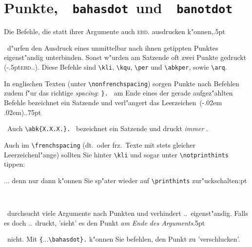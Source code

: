 \documentclass[12pt,a4paper]{article}
\newcommand{\pdfko}[1]{\kern #1pt
                          \strut\ignorespaces}%
\newcommand{\pbs}{\string\ \unskip}
\newcommand{\bs}{\protect\pbs}
\begin{document}

\newpage
\section{Punkte, \,\texttt{\bs bahasdot} \,und \,\texttt{\bs banotdot}}\label{Sect10}\label{Punkte}

Die \BibArts\hy Befehle, die statt ihrer Argumente auch \textsc{ebd.} 
ausdrucken k"onnen,\pdfko{.5}\ 
d"urfen den Ausdruck eines unmittelbar nach ihnen 
getippten Punktes eigenst"andig unterbinden. Sonst w"urden 
am Satzende oft zwei Punkte gedruckt (\kern-.5pt\textsc{ebd.}.). 
Diese Befehle sind \verb|\kli|, \verb|\kqu|, \verb|\per| 
und \verb|\abkper|, sowie \verb|\arq|. 

\vspace{1ex}\noindent
In englischen Texten (unter \verb|\nonfrenchspacing|) sorgen
Punkte nach \BibArts\hy Befehlen zudem f"ur das richtige
\textit{spacing}: \hspace{.2em}\verb*|}. | am Ende eines der gerade aufgez"ahlten
Befehle bezeichnet ein Satzende und verl"angert das 
Leerzeichen~(\kern-.02em\verb*| |\kern.02em).\pdfko{.75}\
Auch \verb*|. | bezeichnet ein Satzende und druckt 
\textit{immer} \hspace{.1em}\abk{X.X.X.}.

Auch im \verb|\frenchspacing| (dt.\ oder frz.\ Texte mit stets gleicher Leerzeichenl"ange) 
sollten Sie hinter \verb|\kli| und sogar unter \verb|\notprinthints| tippen:


\vspace{1.25ex}\noindent
... denn nur dann k"onnen Sie sp"ater wieder auf \verb|\printhints| zur"uckschalten:\pdfko{1}\


\vspace{1.75ex}\noindent
\BibArts\ durchsucht viele Argumente nach Punkten und verhindert ..\ 
eigenst"andig. Falls es doch ..\ druckt, 'sieht' es den Punkt 
\textit{am Ende des Arguments}\pdfko{.5}\ 
nicht. Mit  \hspace{.2em}\verb|{|...\verb|\bahasdot}.| \hspace{-.1em}k"onnen
Sie befehlen, den Punkt zu 'verschlucken'.
\end{document}
